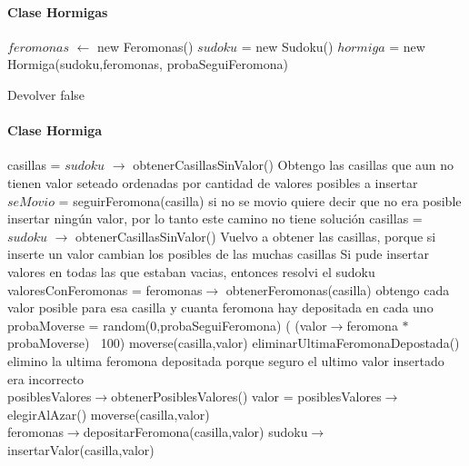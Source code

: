 \paragraph{Clase Hormigas}
\begin{algorithmic}[1]

\State $feromonas$ $\gets$ new Feromonas()
	\State $sudoku$ = new Sudoku()
	\State $hormiga$ = new Hormiga(sudoku,feromonas, probaSeguiFeromona)
	\EndIf
	\EndIf
	
\EndFor

\State Devolver false
\EndFunction
\end{algorithmic}
\paragraph{Clase Hormiga}
\begin{algorithmic}[1]


\State casillas = $sudoku$ $\to$ obtenerCasillasSinValor()
\Comment Obtengo las casillas que aun no tienen valor seteado ordenadas por cantidad de valores posibles a insertar
	\State $seMovio$ = seguirFeromona(casilla)	
			\Comment si no se movio quiere decir que no era posible insertar ningún valor, por lo tanto este camino no tiene soluci\'on
		\EndIf
	\EndIf
	\State casillas = $sudoku$ $\to$ obtenerCasillasSinValor()
	\Comment Vuelvo a obtener las casillas, porque si inserte un valor cambian los posibles de las muchas casillas
\EndWhile
{}
\Comment Si pude insertar valores en todas las que estaban vacias, entonces resolvi el sudoku
\EndFunction
\\
	\State valoresConFeromonas = feromonas$\to$ obtenerFeromonas(casilla)
	\Comment obtengo cada valor posible para esa casilla y cuanta feromona hay depositada en cada uno
		\State probaMoverse = random(0,probaSeguiFeromona)
		\If( (valor$\to$feromona $\ast$ probaMoverse) $\>$ 100)
			\State moverse(casilla,valor)
			\State eliminarUltimaFeromonaDepostada() \Comment elimino la ultima feromona depositada porque seguro el ultimo valor insertado era incorrecto
		\EndIf
	\EndWhile
\EndFunction
\\
	\State posiblesValores$\to$obtenerPosiblesValores()
		\State valor = posiblesValores$\to$elegirAlAzar()	
		\State moverse(casilla,valor)
	\EndIf
\EndFunction
\\
	\State feromonas$\to$depositarFeromona(casilla,valor)
	\State sudoku$\to$insertarValor(casilla,valor)
\EndFunction
\end{algorithmic}


